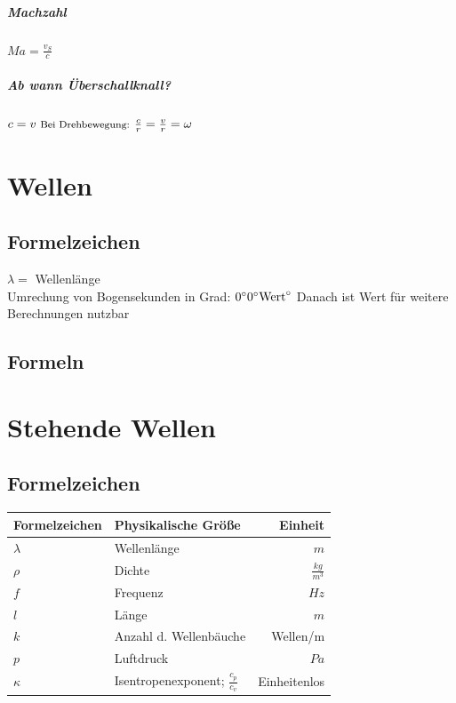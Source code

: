 \documentclass[12pt, a4paper]{scrreprt}
\begin{document}
\paragraph{Machzahl} \dotfill \(Ma = \frac{v_S}{c}\)
\paragraph{Ab wann Überschallknall?} \dotfill \(c = v \text{ \footnotesize Bei Drehbewegung: }\frac{c}{r} = \frac{v}{r} = \omega\)





\chapter{Wellen}

\section{Formelzeichen}
\(\lambda=\) \dotfill Wellenlänge\\
Umrechung von Bogensekunden in Grad: \dotfill \(0 \degree 0\degree \text{Wert}\degree\) Danach ist Wert für weitere Berechnungen nutzbar

\section{Formeln}

\chapter{Stehende Wellen}

\section{Formelzeichen}

\begin{center}
  \makegapedcells{}
  \begin{tabular}{l | l | r}
    Formelzeichen & Physikalische Größe & Einheit\\\hline \hline
    \(\lambda\) & Wellenlänge & \(m\)\\ \hline
    \(\rho\) & Dichte & \(\frac{kg}{m^3}\)\\ \hline
    \(f\) & Frequenz & \(Hz\)\\ \hline
    \(l\) & Länge & \(m\)\\ \hline
    \(k\) & Anzahl d. Wellenbäuche & Wellen/m\\ \hline
    \(p\) & Luftdruck & \(Pa\)\\ \hline
    \(\kappa\) & Isentropenexponent; \(\frac{c_p}{c_v}\) & Einheitenlos\\ \hline
  \end{tabular}
\end{center}
\end{document}
